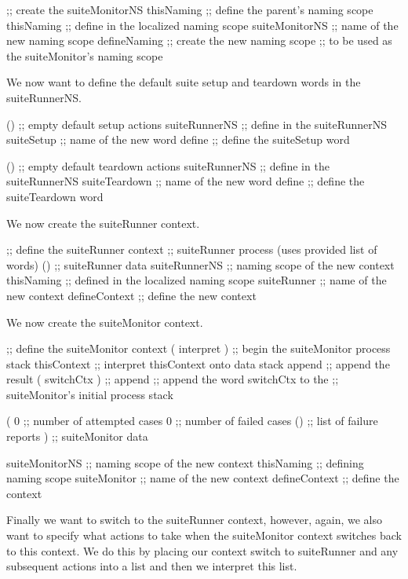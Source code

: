 \startJoylolCode
  ;; create the suiteMonitorNS
  thisNaming      ;; define the parent's naming scope
  thisNaming      ;; define in the localized naming scope
  suiteMonitorNS  ;; name of the new naming scope
  defineNaming    ;; create the new naming scope
                  ;; to be used as the suiteMonitor's naming scope
\stopJoylolCode

We now want to define the default suite setup and teardown words in the 
suiteRunnerNS. 

\startJoylolCode
  ()            ;; empty default setup actions
  suiteRunnerNS ;; define in the suiteRunnerNS
  suiteSetup    ;; name of the new word
  define        ;; define the suiteSetup word
\stopJoylolCode

\startJoylolCode
  ()            ;; empty default teardown actions
  suiteRunnerNS ;; define in the suiteRunnerNS
  suiteTeardown ;; name of the new word
  define        ;; define the suiteTeardown word
\stopJoylolCode

We now create the suiteRunner context.

\startJoylolCode
  ;; define the suiteRunner context
                ;; suiteRunner process (uses provided list of words)
  ()            ;; suiteRunner data
  suiteRunnerNS ;; naming scope of the new context
  thisNaming    ;; defined in the localized naming scope
  suiteRunner   ;; name of the new context
  defineContext ;; define the new context
\stopJoylolCode

We now create the suiteMonitor context.

\startJoylolCode
  ;; define the suiteMonitor context
  ( interpret )   ;; begin the suiteMonitor process stack
  thisContext     ;; interpret thisContext onto data stack
  append          ;; append the result
  ( switchCtx )   ;;
  append          ;; append the word switchCtx to the 
                  ;; suiteMonitor's initial process stack
  
  (
    0             ;; number of attempted cases
    0             ;; number of failed cases
    ()            ;; list of failure reports
  )               ;; suiteMonitor data
  
  suiteMonitorNS  ;; naming scope of the new context
  thisNaming      ;; defining naming scope
  suiteMonitor    ;; name of the new context
  defineContext   ;; define the context
\stopJoylolCode

Finally we want to switch to the suiteRunner context, however, again, we 
also want to specify what actions to take when the suiteMonitor context 
switches back to this context. We do this by placing our context switch to 
suiteRunner and any subsequent actions into a list and then we interpret 
this list. 

